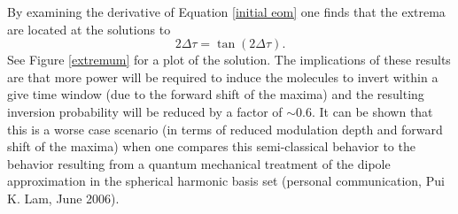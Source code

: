 By examining the derivative of Equation \ref{initial eom} one finds that the extrema are located at the solutions to
\begin{equation}
2 \Delta \tau
=
\tan{(2 \Delta \tau)}.
\end{equation}
See Figure \ref{extremum} for a plot of the solution. The implications of these results are that more power will be required to induce the molecules to invert within a give time window (due to the forward shift of the maxima) and the resulting inversion probability will be reduced by a factor of $\sim0.6$. It can be shown that this is a worse case scenario (in terms of reduced modulation depth and forward shift of the maxima) when one compares this semi-classical behavior to the behavior resulting from a quantum mechanical treatment of the dipole approximation in the spherical harmonic basis set (personal communication, Pui K. Lam, June 2006).
